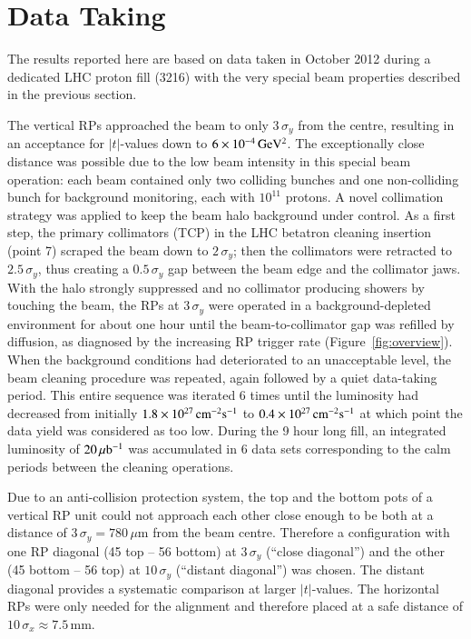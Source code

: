 \section{Data Taking}
\label{sec:data taking}

The results reported here are based on data taken in October 2012 
during a dedicated LHC proton fill (3216)
with the very special beam properties described in the previous section.

The vertical RPs approached the beam to only $3\,\sigma_{y}$ from the centre, resulting in an acceptance for $|t|$-values down to $6 \times 10^{-4}\,\rm GeV^{2}$. The exceptionally close distance was possible due to the low beam intensity in this special beam operation: each beam contained only two colliding bunches and one non-colliding bunch for background monitoring, each with $10^{11}$ protons. A novel collimation strategy was applied to keep the beam halo background under control. As a first step, the primary 
collimators (TCP) in the LHC betatron cleaning insertion (point 7) scraped the beam down to $2\,\sigma_{y}$; then the collimators were retracted to $2.5\,\sigma_{y}$, thus creating a $0.5\,\sigma_{y}$ gap between
the beam edge and the collimator jaws. With the halo strongly suppressed 
and no collimator producing showers by touching the beam, the RPs at 
$3\,\sigma_{y}$ were operated in a background-depleted environment for about one 
hour until the beam-to-collimator gap was refilled by diffusion, as 
diagnosed by the increasing RP trigger rate (Figure~\ref{fig:overview}). When the background conditions
had deteriorated to an unacceptable level, the beam cleaning procedure was repeated, again followed by a quiet data-taking period.
This entire sequence was iterated 6 times until the luminosity had decreased 
from initially $1.8\times10^{27}\,\rm cm^{-2}s^{-1}$ to 
$0.4\times10^{27}\,\rm cm^{-2}s^{-1}$
at which point the data yield was considered as too low. 
During the 9 hour long fill, an integrated luminosity of $20\,\rm \mu b^{-1}$ 
was accumulated in 6 data sets corresponding to the calm periods 
between the cleaning operations. 

Due to an anti-collision protection system, the top and the bottom pots of a 
vertical RP unit could not approach each other close enough to be both at a 
distance of $3\,\sigma_{y} = 780\,\mu$m from the beam centre. Therefore a 
configuration with one RP diagonal (45 top -- 56 bottom) at $3\,\sigma_{y}$ (``close diagonal'') and the other (45 bottom -- 56 top) at 
$10\,\sigma_{y}$ (``distant diagonal'') was chosen. The distant diagonal provides a systematic comparison at larger $|t|$-values.
The horizontal RPs were only needed for the alignment and therefore placed at a
safe distance of $10\,\sigma_{x} \approx 7.5$\,mm.

